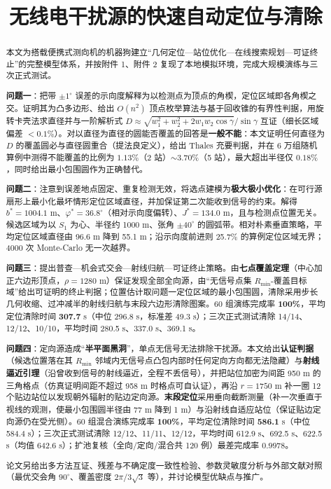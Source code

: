 \documentclass{cumcmthesis}
\title{无线电干扰源的快速自动定位与清除}
\date{}
\begin{document}
\maketitle

\begin{abstract}
本文为搭载便携式测向机的机器狗建立“几何定位—站位优化—在线搜索规划—可证终止”的完整模型体系，并按附件 1、附件 2 复现了本地模拟环境，完成大规模演练与三次正式测试。

\textbf{问题一}：把带 $\pm1^{\circ}$ 误差的示向度解释为以检测点为顶点的角楔，定位区域即各角楔之交。证明其为凸多边形、给出 $O(n^2)$ 顶点枚举算法与基于回收锥的有界性判据，用旋转卡壳法求直径并与一阶解析式 $D\!\approx\!\sqrt{w_1^2\!+\!w_2^2\!+\!2w_1w_2\cos\gamma}/\sin\gamma$ 互证（细长区域偏差 $<0.1\%$）。对以直径为直径的圆能否覆盖的回答是\textbf{一般不能}：本文证明任何直径为 $D$ 的覆盖圆必与直径圆重合（提法良定义），给出 Thales 充要判据，并在 6 万组随机算例中测得不能覆盖的比例为 $1.13\%$（2 站）$\sim3.70\%$（5 站），最大超出半径仅 $0.18\%$，同时给出最小包围圆作为正确替代。

\textbf{问题二}：注意到误差地点固定、重复检测无效，将选点建模为\textbf{极大极小优化}：在可行源扇形上最小化最坏情形定位区域直径，并加保证第二次能收到信号的约束。解得 $b^{*}=1004.1$ m、$\varphi^{*}=36.8^{\circ}$（相对示向度偏转）、$J^{*}=134.0$ m，且与检测点位置无关。候选区域为以 $S_1$ 为心、半径约 1000 m、张角 $\pm40^{\circ}$ 的圆弧带。相对朴素垂直策略，平均定位区域直径由 96.6 m 降到 55.1 m；沿示向度前进则 25.7\% 的算例定位区域无界；4000 次 Monte-Carlo 无一次越界。

\textbf{问题三}：提出普查—机会式交会—射线归航—可证终止策略。由\textbf{七点覆盖定理}（中心加正六边形顶点，$\rho=1280$ m）保证发现全部全向源，由“无信号点集 $R_{\min}$-覆盖目标域”给出可证明的终止判据；位置估计取问题一定位区域的最小包围圆，清除采用步长几何收缩、过冲减半的射线归航与末段六边形清除图案。60 组演练完成率 \textbf{100\%}，平均定位清除时间 \textbf{307.7} s（中位 296.8 s，标准差 49.3 s）；三次正式测试清除 14/14、12/12、10/10，平均时间 280.5 s、337.0 s、369.1 s。

\textbf{问题四}：定向源造成“\textbf{半平面黑洞}”，单点无信号无法排除干扰源。本文给出\textbf{认证判据}（候选位置落在其 $R_{\min}$ 邻域内无信号点凸包内部时任何定向方向都无法隐藏）与\textbf{射线逼近引理}（沿曾收到信号的射线逼近，全程不丢信号），并把站位加密为间距 950 m 的三角格点（仿真证明间距不超过 958 m 时格点可自认证），再沿 $r=1750$ m 补一圈 12 个贴边站位以发现朝外辐射的贴边定向源。\textbf{末段定位}采用垂向截断测量（补一次垂直于视线的观测，使最小包围圆半径由 77 m 降到 1 m）与沿射线自适应站位（保证贴边定向源仍在受光侧）。60 组混合演练完成率 \textbf{100\%}，平均定位清除时间 \textbf{586.1} s（中位 584.4 s）；三次正式测试清除 12/12、11/11、12/12，平均时间 612.9 s、692.5 s、622.5 s（均值 642.6 s）；扩池复核（全向/定向/混合共 120 例）最差完成率 $0.9978$。

论文另给出多方法互证、残差与不确定度一致性检验、参数灵敏度分析与外部文献对照（最优交会角 $90^{\circ}$、覆盖密度 $2\pi/3\sqrt3$ 等），并讨论模型优缺点与推广。

\end{abstract}
\end{document}
